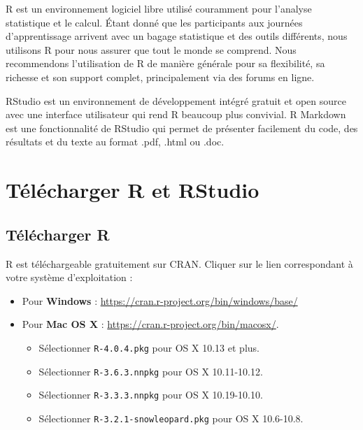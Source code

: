 \documentclass[
  12pt,
]{book}
\providecommand{\tightlist}{%
  \setlength{\itemsep}{0pt}\setlength{\parskip}{0pt}}
\begin{document}
R est un environnement logiciel libre utilisé couramment pour l'analyse statistique et le calcul. Étant donné que les participants aux journées d'apprentissage arrivent avec un bagage statistique et des outils différents, nous utilisons R pour nous assurer que tout le monde se comprend. Nous recommendons l'utilisation de R de manière générale pour sa flexibilité, sa richesse et son support complet, principalement via des forums en ligne.

RStudio est un environnement de développement intégré gratuit et open source avec une interface utilisateur qui rend R beaucoup plus convivial. R Markdown est une fonctionnalité de RStudio qui permet de présenter facilement du code, des résultats et du texte au format .pdf, .html ou .doc.

\hypertarget{tuxe9luxe9charger-r-et-rstudio}{%
\section{Télécharger R et RStudio}\label{tuxe9luxe9charger-r-et-rstudio}}

\hypertarget{tuxe9luxe9charger-r}{%
\subsection{Télécharger R}\label{tuxe9luxe9charger-r}}

R est téléchargeable gratuitement sur CRAN. Cliquer sur le lien correspondant à votre système d'exploitation :

\begin{itemize}
\tightlist
\item
  Pour \textbf{Windows} : \url{https://cran.r-project.org/bin/windows/base/}
\item
  Pour \textbf{Mac OS X} : \url{https://cran.r-project.org/bin/macosx/}.

  \begin{itemize}
  \tightlist
  \item
    Sélectionner \texttt{R-4.0.4.pkg} pour OS X 10.13 et plus.
  \item
    Sélectionner \texttt{R-3.6.3.nnpkg} pour OS X 10.11-10.12.
  \item
    Sélectionner \texttt{R-3.3.3.nnpkg} pour OS X 10.19-10.10.
  \item
    Sélectionner \texttt{R-3.2.1-snowleopard.pkg} pour OS X 10.6-10.8.
  \end{itemize}
\end{itemize}
\end{document}
